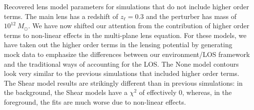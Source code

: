 \label{mockshear} Recovered lens model parameters for simulations that do not include higher order terms. The main lens has a redshift of $z_\ell = 0.3$ and the perturber has mass of $10^{12}~ M_\odot$. We have now shifted our attention from the contribution of higher order terms to non-linear effects in the multi-plane lens equation. For these models, we have taken out the higher order terms in the lensing potential by generating mock data to emphasize the differences between our environment/LOS framework and the traditional ways of accounting for the LOS. The None model contours look very similar to the previous simulations that included higher order terms. The Shear model results are strikingly different than in previous simulations: in the background, the Shear models have a $\chi^2$ of effectively 0, whereas, in the foreground, the fits are much worse due to non-linear effects.